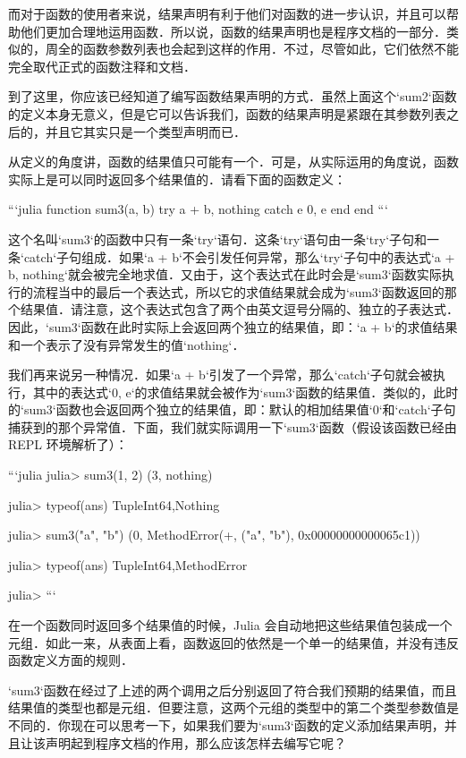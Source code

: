 而对于函数的使用者来说，结果声明有利于他们对函数的进一步认识，并且可以帮助他们更加合理地运用函数．所以说，函数的结果声明也是程序文档的一部分．类似的，周全的函数参数列表也会起到这样的作用．不过，尽管如此，它们依然不能完全取代正式的函数注释和文档．

到了这里，你应该已经知道了编写函数结果声明的方式．虽然上面这个`sum2`函数的定义本身无意义，但是它可以告诉我们，函数的结果声明是紧跟在其参数列表之后的，并且它其实只是一个类型声明而已．

从定义的角度讲，函数的结果值只可能有一个．可是，从实际运用的角度说，函数实际上是可以同时返回多个结果值的．请看下面的函数定义：

```julia
function sum3(a, b)
    try
        a + b, nothing
    catch e
        0, e
    end
end
```

这个名叫`sum3`的函数中只有一条`try`语句．这条`try`语句由一条`try`子句和一条`catch`子句组成．如果`a + b`不会引发任何异常，那么`try`子句中的表达式`a + b, nothing`就会被完全地求值．又由于，这个表达式在此时会是`sum3`函数实际执行的流程当中的最后一个表达式，所以它的求值结果就会成为`sum3`函数返回的那个结果值．请注意，这个表达式包含了两个由英文逗号分隔的、独立的子表达式．因此，`sum3`函数在此时实际上会返回两个独立的结果值，即：`a + b`的求值结果和一个表示了没有异常发生的值`nothing`．

我们再来说另一种情况．如果`a + b`引发了一个异常，那么`catch`子句就会被执行，其中的表达式`0, e`的求值结果就会被作为`sum3`函数的结果值．类似的，此时的`sum3`函数也会返回两个独立的结果值，即：默认的相加结果值`0`和`catch`子句捕获到的那个异常值．下面，我们就实际调用一下`sum3`函数（假设该函数已经由 REPL 环境解析了）：

```julia
julia> sum3(1, 2)
(3, nothing)

julia> typeof(ans)
Tuple{Int64,Nothing}

julia> sum3("a", "b")
(0, MethodError(+, ("a", "b"), 0x00000000000065c1))

julia> typeof(ans)
Tuple{Int64,MethodError}

julia> 
```

在一个函数同时返回多个结果值的时候，Julia 会自动地把这些结果值包装成一个元组．如此一来，从表面上看，函数返回的依然是一个单一的结果值，并没有违反函数定义方面的规则．

`sum3`函数在经过了上述的两个调用之后分别返回了符合我们预期的结果值，而且结果值的类型也都是元组．但要注意，这两个元组的类型中的第二个类型参数值是不同的．你现在可以思考一下，如果我们要为`sum3`函数的定义添加结果声明，并且让该声明起到程序文档的作用，那么应该怎样去编写它呢？

